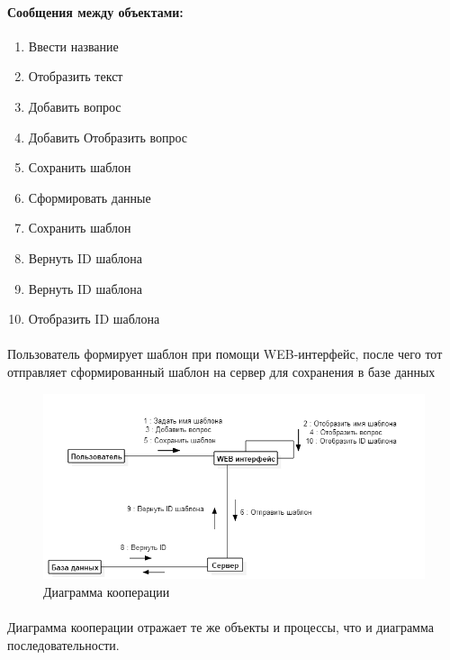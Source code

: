 \documentclass{article}
\begin{document}
        \paragraph{Сообщения между объектами:}
        \begin{enumerate}
            \item Ввести название
            \item Отобразить текст
            \item Добавить вопрос
            \item Добавить Отобразить вопрос
            \item Сохранить шаблон
            \item Сформировать данные
            \item Сохранить шаблон
            \item Вернуть ID шаблона
            \item Вернуть ID шаблона
            \item Отобразить ID шаблона
        \end{enumerate}
        \paragraph{}
        Пользователь формирует шаблон при помощи WEB-интерфейс, после чего тот
        отправляет сформированный шаблон на сервер для сохранения в базе данных

        \begin{figure}[H]
            \includegraphics[width=\textwidth, center]{Communication_CreateTestTemplate}
            \caption{Диаграмма кооперации}
        \end{figure}
        \paragraph{}
        Диаграмма кооперации отражает те же объекты и процессы, что и диаграмма
        последовательности.
\end{document}
